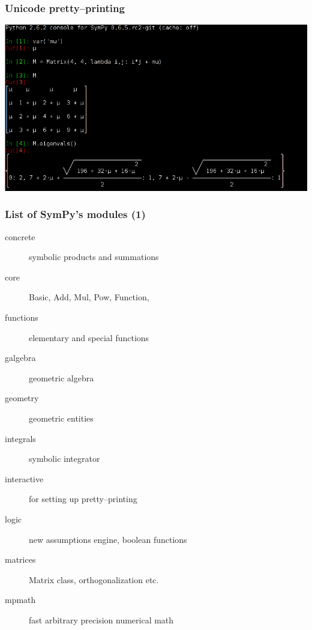 \documentclass[handout]{beamer}
\begin{document}
\begin{frame}[fragile]
    \frametitle{Unicode pretty--printing}

    \begin{center}
        \includegraphics[scale=0.65]{images/sympy-unicode.png}
    \end{center}
\end{frame}


\begin{frame}[fragile]
    \frametitle{List of SymPy's modules (1)}

    \begin{description}
        \item[concrete] symbolic products and summations
        \item[core] Basic, Add, Mul, Pow, Function, \structure{\ldots}
        \item[functions] elementary and special functions
        \item[galgebra] geometric algebra
        \item[geometry] geometric entities
        \item[integrals] symbolic integrator
        \item[interactive] for setting up pretty--printing
        \item[logic] new assumptions engine, boolean functions
        \item[matrices] Matrix class, orthogonalization etc.
        \item[mpmath] fast arbitrary precision numerical math
    \end{description}
\end{frame}
\end{document}
